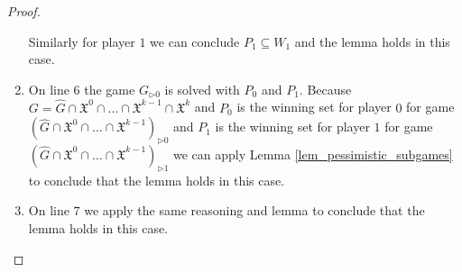 \begin{lemma}
\begin{proof}
\begin{enumerate}
			Similarly for player $1$ we can conclude $P_1 \subseteq W_1$ and the lemma holds in this case.
			\item On line $6$ the game $G_{\triangleright0}$ is solved with $P_0$ and $P_1$. Because $G = \hat{G} \cap \mathfrak{X}^0 \cap \dots \cap \mathfrak{X}^{k-1} \cap \mathfrak{X}^k$ and $P_0$ is the winning set for player $0$ for game $(\hat{G} \cap \mathfrak{X}^0 \cap \dots \cap \mathfrak{X}^{k-1})_{\triangleright0}$ and $P_1$ is the winning set for player $1$ for game $(\hat{G} \cap \mathfrak{X}^0 \cap \dots \cap \mathfrak{X}^{k-1})_{\triangleright1}$ we can apply Lemma \ref{lem_pessimistic_subgames} to conclude that the lemma holds in this case.
			\item On line $7$ we apply the same reasoning and lemma to conclude that the lemma holds in this case.
		\end{enumerate}
	\end{proof}
\end{lemma}

